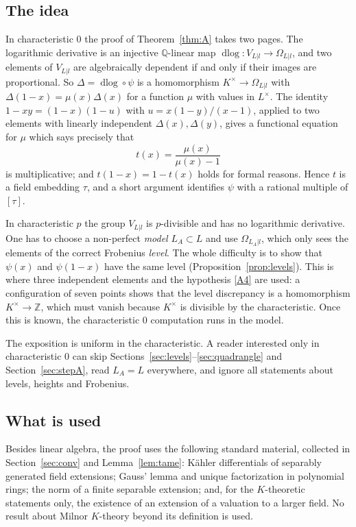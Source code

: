 \documentclass[11pt]{amsart}
\theoremstyle{definition}
\theoremstyle{remark}
\newcommand{\ZZ}{\mathbb{Z}}
\newcommand{\QQ}{\mathbb{Q}}
\newcommand{\dlog}{\operatorname{dlog}}
\begin{document}
\subsection{The idea}
In characteristic $0$ the proof of Theorem~\ref{thm:A} takes two pages.
The logarithmic derivative is an injective $\QQ$-linear map $\dlog\colon V_{L|l}\to\Omega_{L|l}$, and two elements of $V_{L|l}$ are algebraically dependent if and only if their images are proportional.
So $\Delta=\dlog\circ\psi$ is a homomorphism $K^\times\to\Omega_{L|l}$ with $\Delta(1-x)=\mu(x)\Delta(x)$ for a function $\mu$ with values in $L^\times$.
The identity $1-xy=(1-x)(1-u)$ with $u=x(1-y)/(x-1)$, applied to two elements with linearly independent $\Delta(x),\Delta(y)$, gives a functional equation for $\mu$ which says precisely that
\[ t(x)=\frac{\mu(x)}{\mu(x)-1} \]
is multiplicative; and $t(1-x)=1-t(x)$ holds for formal reasons. Hence $t$ is a field embedding $\tau$, and a short argument identifies $\psi$ with a rational multiple of $[\tau]$.

In characteristic $p$ the group $V_{L|l}$ is $p$-divisible and has no logarithmic derivative. One has to choose a non-perfect \emph{model} $L_A\subset L$ and use $\Omega_{L_A|l}$, which only sees the elements of the
correct Frobenius \emph{level}. The whole difficulty is to show that $\psi(x)$ and $\psi(1-x)$ have the same level (Proposition~\ref{prop:levels}).
This is where three independent elements and the hypothesis \ref{A4} are used: a configuration of seven points shows that the level discrepancy is a homomorphism $K^\times\to\ZZ$, which must vanish because $K^\times$ is divisible by the characteristic.
Once this is known, the characteristic $0$ computation runs in the model.

The exposition is uniform in the characteristic. A reader interested only in characteristic $0$ can skip Sections~\ref{sec:levels}--\ref{sec:quadrangle} and Section~\ref{sec:stepA}, read $L_A=L$ everywhere, and ignore all statements about levels, heights and Frobenius.

\subsection{What is used}
Besides linear algebra, the proof uses the following standard material, collected in Section~\ref{sec:conv} and Lemma~\ref{lem:tame}:
K\"ahler differentials of separably generated field extensions; Gauss' lemma and unique factorization in polynomial rings; the norm of a finite separable extension;
and, for the $K$-theoretic statements only, the existence of an extension of a valuation to a larger field. No result about Milnor $K$-theory beyond its definition is used.
\end{document}
